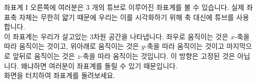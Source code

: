\begin{surferPage}{좌표계 I}
오른쪽에 여러분은 $3$ 개의 튜브로 이루어진 좌표계를 볼 수 있습니다. 실제 좌표축 자체는 무한히 얇기 때문에 우리는 이를 시각화하기 위해 축 대신에 튜브를 사용합니다.\\
이 좌표계는 우리가 살고있는 3차원 공간을 나타냅니다. 좌우로 움직이는 것은 $x$-축을 따라 움직이는 것이고, 위아래로 움직이는 것은 $y$-축을 따라 움직이는 것이고 마지막으로 앞뒤로 움직이는 것은 $z$-축을 따라 움직이는 것입니다. 이 방향은 고정된 것은 아닙니다. 왜냐하면 여러분이 좌표계를 돌릴 수 있기 때문입니다.\\
\vspace{0.3cm}
화면을 터치하여 좌표계를 돌려보세요.
\end{surferPage}
